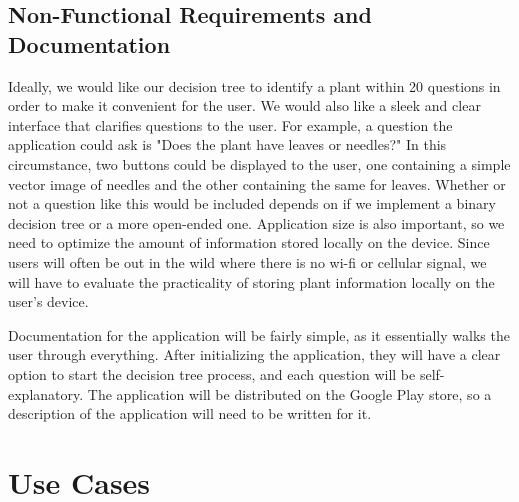 \documentclass[a4paper]{article}
\begin{document}
\subsection{Non-Functional Requirements and Documentation}
Ideally, we would like our decision tree to identify a plant within 20 questions in order to make it convenient for the user. We would also like a sleek and clear interface that clarifies questions to the user. For example, a question the application could ask is "Does the plant have leaves or needles?" In this circumstance, two buttons could be displayed to the user, one containing a simple vector image of needles and the other containing the same for leaves. Whether or not a question like this would be included depends on if we implement a binary decision tree or a more open-ended one. Application size is also important, so we need to optimize the amount of information stored locally on the device. Since users will often be out in the wild where there is no wi-fi or cellular signal, we will have to evaluate the practicality of storing plant information locally on the user's device.

Documentation for the application will be fairly simple, as it essentially walks the user through everything. After initializing the application, they will have a clear option to start the decision tree process, and each question will be self-explanatory. The application will be distributed on the Google Play store, so a description of the application will need to be written for it.

\pagebreak

\section{Use Cases}
\end{document}
